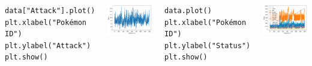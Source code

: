 \begin{frame}[fragile]
%
\begin{columns}[T]
\begin{codebox}
\begin{verbatim}
data["Attack"].plot()
plt.xlabel("Pokémon ID")
plt.ylabel("Attack")
plt.show()
\end{verbatim}
\end{codebox}
%
\begin{center}
	\includegraphics[width=.8\linewidth]{./gfx/pokemon-atk}
\end{center}
%
\begin{codebox}
\begin{verbatim}
data.plot()
plt.xlabel("Pokémon ID")
plt.ylabel("Status")
plt.show()
\end{verbatim}
\end{codebox}
%
\begin{center}
	\includegraphics[width=.8\linewidth]{./gfx/pokemon-tot}
\end{center}
\end{columns}
%
\end{frame}


